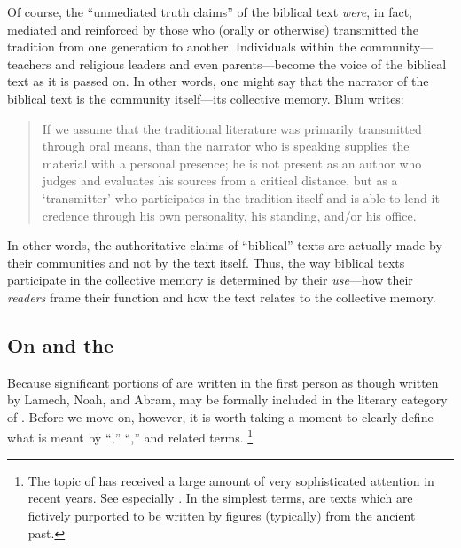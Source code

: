 Of course, the ``unmediated truth claims'' of the biblical text \emph{were}, in fact, mediated and reinforced by those who (orally or otherwise) transmitted the tradition from one generation to another.%
    \autocite[33]{blum_barton-etal2007}
Individuals within the community---teachers and religious leaders and even parents---become the voice of the biblical text as it is passed on. In other words, one might say that the narrator of the biblical text is the community itself---its collective memory. Blum writes:

\begin{quote}
    If we assume that the traditional literature was primarily transmitted through oral means, than the narrator who is speaking supplies the material with a personal presence; he is not present as an author who judges and evaluates his sources from a critical distance, but as a `transmitter' who participates in the tradition itself and is able to lend it credence through his own personality, his standing, and/or his office.\autocite[33]{blum_barton-etal2007}
\end{quote}
\noindent
In other words, the authoritative claims of ``biblical'' texts are actually made by their communities and not by the text itself. Thus, the way biblical texts participate in the collective memory is determined by their \emph{use}---how their \emph{readers} frame their function and how the text relates to the collective memory. 

\subsection{On \Psy and the \Psa}

Because significant portions of \ga are written in the first person as though written by Lamech, Noah, and Abram, \ga may be formally included in the literary category of \psy. Before we move on, however, it is worth taking a moment to clearly define what is meant by ``\psy,'' ``\psa,'' and related terms.%
    \footnote{The topic of \psy has received a large amount of very sophisticated attention in recent years. See especially
        \cite{mroczek2016}
        \cite{tigchelaar_tigchelaar2014}
        \cite{reed_towsend-moulie2011}
        \cite{reed_jts2009}
        \cite{reed_ditomasso-turcescu2008}
        \cite{najman_hilhorst-puech2007}
        \cite{najman2003}.
        In the simplest terms, \psa are texts which are fictively purported to be written by figures (typically) from the ancient past.}

